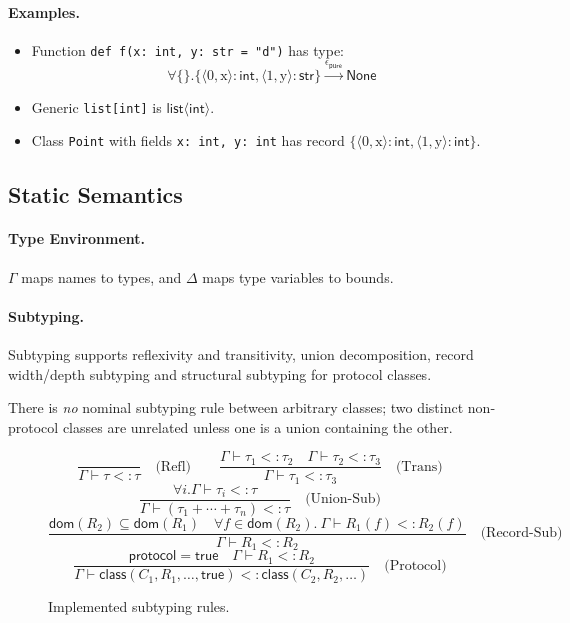 \paragraph{Examples.}  
\begin{itemize}
\item Function \texttt{def f(x: int, y: str = "d")} has type:
 \[\forall \{\}.\{\langle 0, \text{x} \rangle : \mathsf{int}, \langle 1, \text{y} \rangle : \mathsf{str}\} \xrightarrow{\epsilon_\mathsf{pure}} \mathsf{None}\]
\item Generic \texttt{list[int]} is $\mathsf{list}\langle\mathsf{int}\rangle$.
\item Class \texttt{Point} with fields \texttt{x: int, y: int} has record $\{\langle 0, \text{x} \rangle : \mathsf{int}, \langle 1, \text{y} \rangle : \mathsf{int}\}$.
\end{itemize}

\subsection{Static Semantics}

\paragraph{Type Environment.}  
$\Gamma$ maps names to types, and $\Delta$ maps type variables to bounds.

\paragraph{Subtyping.}  
Subtyping supports reflexivity and transitivity, union decomposition, record width/depth subtyping and structural subtyping for protocol classes.

There is \emph{no} nominal subtyping rule between arbitrary classes; two distinct non‐protocol classes are unrelated unless one is a union containing the other.

\begin{figure*}[t]
\centering
\[
\frac{}{\Gamma \vdash \tau <: \tau} \quad \text{(Refl)}
\qquad
\frac{\Gamma \vdash \tau_1 <: \tau_2 \quad \Gamma \vdash \tau_2 <: \tau_3}{\Gamma \vdash \tau_1 <: \tau_3} \quad \text{(Trans)}
\]
\[
\frac{\forall i. \Gamma \vdash \tau_i <: \tau}{\Gamma \vdash (\tau_1 + \cdots + \tau_n) <: \tau} \quad \text{(Union-Sub)}
\]
\[
\frac{\mathsf{dom}(R_2) \subseteq \mathsf{dom}(R_1) \quad \forall f \in \mathsf{dom}(R_2).\ \Gamma \vdash R_1(f) <: R_2(f)}{\Gamma \vdash R_1 <: R_2} \quad \text{(Record-Sub)}
\]
\[
\frac{\mathsf{protocol} = \mathsf{true} \quad \Gamma \vdash R_1 <: R_2}{\Gamma \vdash \mathsf{class}(C_1, R_1, \ldots, \mathsf{true}) <: \mathsf{class}(C_2, R_2, \ldots)} \quad \text{(Protocol)}
\]
\caption{Implemented subtyping rules.}
\label{fig:subtyping}
\end{figure*}

